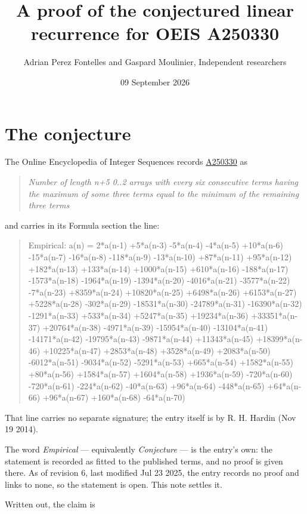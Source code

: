 \documentclass[11pt]{article}
\title{A proof of the conjectured linear recurrence for OEIS A250330}
\author{Adrian Perez Fontelles and Gaspard Moulinier, Independent researchers}
\date{09 September 2026}
\theoremstyle{definition}
\begin{document}
\maketitle
\section{The conjecture}

The Online Encyclopedia of Integer Sequences records \href{https://oeis.org/A250330}{A250330} as

\begin{quote}\itshape Number of length n+5 0..2 arrays with every six consecutive terms having the maximum of some three terms equal to the minimum of the remaining three terms\end{quote}

and carries in its Formula section the line:

\begin{quote}\ttfamily Empirical: a(n) = 2*a(n-1) +5*a(n-3) -5*a(n-4) -4*a(n-5) +10*a(n-6) -15*a(n-7) -16*a(n-8) -118*a(n-9) -13*a(n-10) +87*a(n-11) +95*a(n-12) +182*a(n-13) +133*a(n-14) +1000*a(n-15) +610*a(n-16) -188*a(n-17) -1573*a(n-18) -1964*a(n-19) -1394*a(n-20) -4016*a(n-21) -3577*a(n-22) -7*a(n-23) +8359*a(n-24) +10820*a(n-25) +6498*a(n-26) +6153*a(n-27) +5228*a(n-28) -302*a(n-29) -18531*a(n-30) -24789*a(n-31) -16390*a(n-32) -1291*a(n-33) +533*a(n-34) +5247*a(n-35) +19234*a(n-36) +33351*a(n-37) +20764*a(n-38) -4971*a(n-39) -15954*a(n-40) -13104*a(n-41) -14171*a(n-42) -19795*a(n-43) -9871*a(n-44) +11343*a(n-45) +18399*a(n-46) +10225*a(n-47) +2853*a(n-48) +3528*a(n-49) +2083*a(n-50) -6012*a(n-51) -9034*a(n-52) -5291*a(n-53) +665*a(n-54) +1582*a(n-55) +80*a(n-56) +1584*a(n-57) +1604*a(n-58) +1936*a(n-59) -720*a(n-60) -720*a(n-61) -224*a(n-62) -40*a(n-63) +96*a(n-64) -448*a(n-65) +64*a(n-66) +96*a(n-67) +160*a(n-68) -64*a(n-70)\end{quote}

That line carries no separate signature; the entry itself is by R. H. Hardin (Nov 19 2014).

The word {\itshape Empirical} --- equivalently {\itshape Conjecture} --- is the entry's own: the statement is recorded as fitted to the published terms, and no proof is given there. As of revision 6, last modified Jul 23 2025, the entry records no proof and links to none, so the statement is open. This note settles it.

Written out, the claim is
\end{document}

